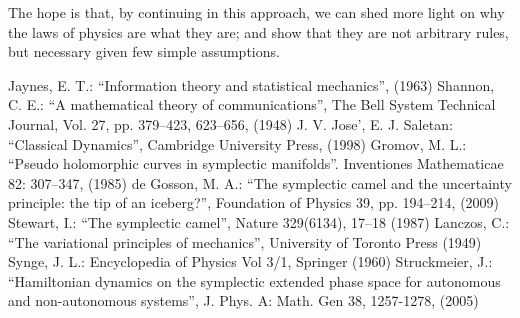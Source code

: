 \documentclass[twocolumn,floatfix,nofootinbib]{revtex4}   %
\theoremstyle{theorem}
\theoremstyle{definition}
\begin{document}
The hope is that, by continuing in this approach, we can shed more light on why the laws of physics are what they are; and show that they are not arbitrary rules, but necessary given few simple assumptions.

\begin{thebibliography}{5}

 Jaynes, E. T.: ``Information theory and statistical mechanics'', (1963)
 Shannon, C. E.: ``A mathematical theory of communications'', The Bell System Technical Journal, Vol. 27, pp. 379–423, 623–656, (1948)
 J. V. Jose', E. J. Saletan: ``Classical Dynamics'', Cambridge University Press, (1998)
 Gromov, M. L.: ``Pseudo holomorphic curves in symplectic manifolds''. Inventiones Mathematicae 82: 307–347, (1985)
 de Gosson, M. A.: ``The symplectic camel and the uncertainty principle: the tip of an iceberg?'', Foundation of Physics 39, pp. 194–214, (2009)
 Stewart, I.: ``The symplectic camel'', Nature 329(6134), 17–18 (1987)
 Lanczos, C.: ``The variational principles of mechanics'', University of Toronto Press (1949)
 Synge, J. L.: Encyclopedia of Physics Vol 3/1, Springer (1960)
 Struckmeier, J.: ``Hamiltonian dynamics on the symplectic extended phase space for autonomous and non-autonomous systems'', J. Phys. A: Math. Gen 38, 1257-1278, (2005)

\end{thebibliography}
\end{document}
